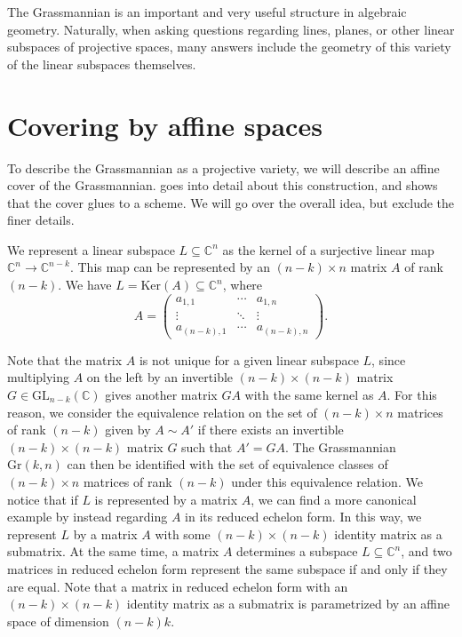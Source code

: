 The Grassmannian is an important and very useful structure in algebraic geometry. Naturally, when asking questions regarding lines, planes, or other linear subspaces of projective spaces, many answers include the geometry of this variety of the linear subspaces themselves. 




\section{Covering by affine spaces}

To describe the Grassmannian as a projective variety, we will describe an affine cover of the Grassmannian. \cite[Section A.8]{EO25} goes into detail about this construction, and shows that the cover glues to a scheme. We will go over the overall idea, but exclude the finer details. 

We represent a linear subspace $L \subseteq \mathbb{C}^n$ as the kernel of a surjective linear map $\mathbb{C}^n \to \mathbb{C}^{n-k}$. This map can be represented by an $(n-k) \times n$ matrix $A$ of rank $(n-k)$. We have $L = \text{Ker}(A) \subseteq \mathbb{C}^n$, where
\[A = \begin{pmatrix}
a_{1,1} & \cdots & a_{1,n} \\
\vdots & \ddots & \vdots \\
a_{(n-k),1} & \cdots & a_{(n-k),n}
\end{pmatrix}.\]

Note that the matrix $A$ is not unique for a given linear subspace $L$, since multiplying $A$ on the left by an invertible $(n-k) \times (n-k)$ matrix $G \in \mathrm{GL}_{n-k}(\mathbb{C})$ gives another matrix $GA$ with the same kernel as $A$. For this reason, we consider the equivalence relation on the set of $(n-k) \times n$ matrices of rank $(n-k)$ given by $A \sim A'$ if there exists an invertible $(n-k) \times (n-k)$ matrix $G$ such that $A' = GA$. The Grassmannian $\mathrm{Gr}(k,n)$ can then be identified with the set of equivalence classes of $(n-k) \times n$ matrices of rank $(n-k)$ under this equivalence relation. We notice that if $L$ is represented by a matrix $A$, we can find a more canonical example by instead regarding $A$ in its reduced echelon form. In this way, we represent $L$ by a matrix $A$ with some $(n-k)\times(n-k)$ identity matrix as a submatrix. At the same time, a matrix $A$ determines a subspace $L \subseteq \mathbb{C}^n$, and two matrices in reduced echelon form represent the same subspace if and only if they are equal. Note that a matrix in reduced echelon form with an $(n-k)\times(n-k)$ identity matrix as a submatrix is parametrized by an affine space of dimension $(n-k)k$.

